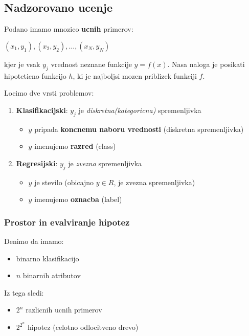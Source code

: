 \documentclass{article}
\begin{document}
\begin{multicols}{2}
\subsection{Nadzorovano ucenje}
Podano imamo mnozico \textbf{ucnih} primerov:

\begin{center}
  \begin{math}
    (x_1, y_1), (x_2, y_2), \dots, (x_N, y_N)
  \end{math}
\end{center}
kjer je vsak $y_j$ vrednost neznane funkcije $y = f(x)$.
Nasa naloga je posikati hipoteticno funkcijo $h$, ki je najboljsi
mozen priblizek funkciji $f$.

Locimo dve vrsti problemov:
\begin{enumerate}
  \item \textbf{Klasifikacijski}: $y_j$ je \textit{diskretna(kategoricna)} spremenljivka
      \begin{itemize}
        \item $y$ pripada \textbf{koncnemu naboru vrednosti} (diskretna spremenljivka)
        \item $y$ imenujemo \textbf{razred} (class)
      \end{itemize}
  \item \textbf{Regresijski}: $y_j$ je \textit{zvezna} spremenljivka
      \begin{itemize}
        \item $y$ je stevilo (obicajno $y \in R$, je zvezna spremenljivka)
        \item $y$ imenujemo \textbf{oznacba} (label)
      \end{itemize}
\end{enumerate}

\subsubsection{Prostor in evalviranje hipotez}
Denimo da imamo:
\begin{itemize}
   \item binarno klasifikacijo
   \item $n$ binarnih atributov
\end{itemize}
Iz tega sledi:
\begin{itemize}
  \item $2^n$ razlicnih ucnih primerov
  \item $2^{2^n}$ hipotez (celotno odlocitveno drevo)
\end{itemize}


\end{multicols}
\end{document}
